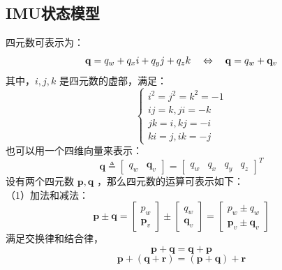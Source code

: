 \subsection{IMU状态模型}
四元数可表示为：
\begin{equation}
\setlength{\abovedisplayskip}{6pt}
\setlength{\belowdisplayskip}{6pt}
\label{eqn:2.16}
\mathbf{q}=q_{w}+q_{x} i+q_{y} j+q_{z} k \quad \Leftrightarrow \quad \mathbf{q}=q_{w}+\mathbf{q}_{v}
\end{equation}
其中，$i,j,k$ 是四元数的虚部，满足：
\begin{equation}
\label{eqn:2.17}
\left\{\begin{array}{l}{i^{2}=j^{2}=k^{2}=-1} \\ {i j=k, j i=-k} \\ {j k=i, k j=-i} \\ {k i=j, i k=-j}\end{array}\right.
\end{equation}
也可以用一个四维向量来表示：
\begin{equation}
\label{eqn:2.18}
\mathbf{q} \triangleq \left[ \begin{array}{cc}
{q_{w}} & {\mathbf{q}_{v} }
\end{array}\right] = \left[ \begin{array}{cccc}
{q_{w}} & {q_{x}} & {q_{y}} & {q_{z} } \end{array}\right]^{T}
\end{equation}
设有两个四元数 $\mathbf{p}, \mathbf{q} $ ，那么四元数的运算可表示如下：\\
（1）加法和减法：
\begin{equation}
\label{eqn:2.19}
\mathbf{p} \pm \mathbf{q}=\left[ \begin{array}{c}{p_{w}} \\ {\mathbf{p}_{v}}\end{array}\right] \pm \left[ \begin{array}{c}{q_{w}} \\ {\mathbf{q}_{v}}\end{array}\right]=\left[ \begin{array}{c}{p_{w} \pm q_{w}} \\ {\mathbf{p}_{v} \pm \mathbf{q}_{v}}\end{array}\right]
\end{equation}
满足交换律和结合律，
\begin{equation}
\label{eqn:2.20}
\mathbf{p}+\mathbf{q}=\mathbf{q}+\mathbf{p}
\end{equation}
\begin{equation}
\label{eqn:2.21}
\mathbf{p}+(\mathbf{q}+\mathbf{r})=(\mathbf{p}+\mathbf{q})+\mathbf{r}
\end{equation}
